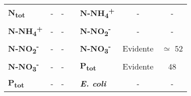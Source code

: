 \begin{table}[H]
\begin{center}
\begin{tabular}{lccllcc}
		\multicolumn{1}{|l|}{\textbf{N\textsubscript{tot}}}      & \multicolumn{1}{c|}{-}                                                                        & \multicolumn{1}{c|}{-}                                                                          & \multicolumn{1}{l|}{} & \multicolumn{1}{l|}{\textbf{N-NH\textsubscript{4}\textsuperscript{+}}}           & \multicolumn{1}{c|}{-}                                                                       & \multicolumn{1}{c|}{-}                                                                          \\ \cline{1-3} \cline{5-7} 
		\multicolumn{1}{|l|}{\textbf{N-NH\textsubscript{4}\textsuperscript{+}}}    & \multicolumn{1}{c|}{-}                                                                        & \multicolumn{1}{c|}{-}                                                                          & \multicolumn{1}{l|}{} & \multicolumn{1}{l|}{\textbf{N-NO\textsubscript{2}\textsuperscript{-}}}           & \multicolumn{1}{c|}{-}                                                                       & \multicolumn{1}{c|}{-}                                                                          \\ \cline{1-3} \cline{5-7} 
		\multicolumn{1}{|l|}{\textbf{N-NO\textsubscript{2}\textsuperscript{-}}}    & \multicolumn{1}{c|}{-}                                                                        & \multicolumn{1}{c|}{-}                                                                          & \multicolumn{1}{l|}{} & \multicolumn{1}{l|}{\textbf{N-NO\textsubscript{3}\textsuperscript{-}}}           & \multicolumn{1}{c|}{Evidente}                                                                & \multicolumn{1}{c|}{$\simeq$ 52}                                                                   \\ \cline{1-3} \cline{5-7} 
		\multicolumn{1}{|l|}{\textbf{N-NO\textsubscript{3}\textsuperscript{-}}}    & \multicolumn{1}{c|}{-}                                                                        & \multicolumn{1}{c|}{-}                                                                          & \multicolumn{1}{l|}{} & \multicolumn{1}{l|}{\textbf{P\textsubscript{tot}}}             & \multicolumn{1}{c|}{Evidente}                                                                & \multicolumn{1}{c|}{48}                                                                   \\ \cline{1-3} \cline{5-7} 
		\multicolumn{1}{|l|}{\textbf{P\textsubscript{tot}}}      & \multicolumn{1}{c|}{-}                                                                        & \multicolumn{1}{c|}{-}                                                                          & \multicolumn{1}{l|}{} & \multicolumn{1}{l|}{\textbf{\textit{E. coli}}}          & \multicolumn{1}{c|}{-}                                                                       & \multicolumn{1}{c|}{-}                                                                          \\ \cline{1-3} \cline{5-7} 

\end{tabular}
\end{center}
\end{table}
